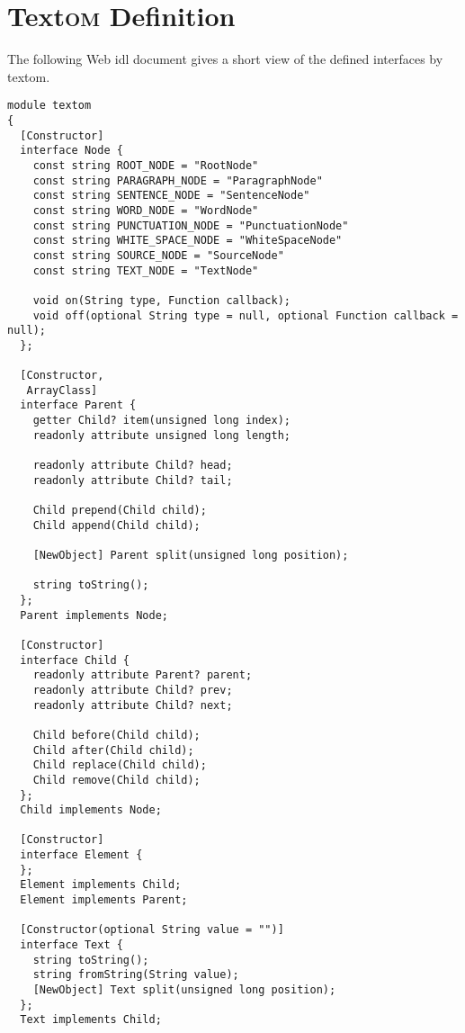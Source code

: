 
\chapter{Text\textsc{om} Definition}\label{appendix-textom}

The following Web \acrshort{idl} document gives a short view of the defined
  interfaces by \gls{textom}.

\begin{lstlisting}
module textom
{
  [Constructor]
  interface Node {
    const string ROOT_NODE = "RootNode"
    const string PARAGRAPH_NODE = "ParagraphNode"
    const string SENTENCE_NODE = "SentenceNode"
    const string WORD_NODE = "WordNode"
    const string PUNCTUATION_NODE = "PunctuationNode"
    const string WHITE_SPACE_NODE = "WhiteSpaceNode"
    const string SOURCE_NODE = "SourceNode"
    const string TEXT_NODE = "TextNode"

    void on(String type, Function callback);
    void off(optional String type = null, optional Function callback = null);
  };

  [Constructor,
   ArrayClass]
  interface Parent {
    getter Child? item(unsigned long index);
    readonly attribute unsigned long length;

    readonly attribute Child? head;
    readonly attribute Child? tail;

    Child prepend(Child child);
    Child append(Child child);

    [NewObject] Parent split(unsigned long position);

    string toString();
  };
  Parent implements Node;

  [Constructor]
  interface Child {
    readonly attribute Parent? parent;
    readonly attribute Child? prev;
    readonly attribute Child? next;

    Child before(Child child);
    Child after(Child child);
    Child replace(Child child);
    Child remove(Child child);
  };
  Child implements Node;

  [Constructor]
  interface Element {
  };
  Element implements Child;
  Element implements Parent;

  [Constructor(optional String value = "")]
  interface Text {
    string toString();
    string fromString(String value);
    [NewObject] Text split(unsigned long position);
  };
  Text implements Child;


\end{lstlisting}
